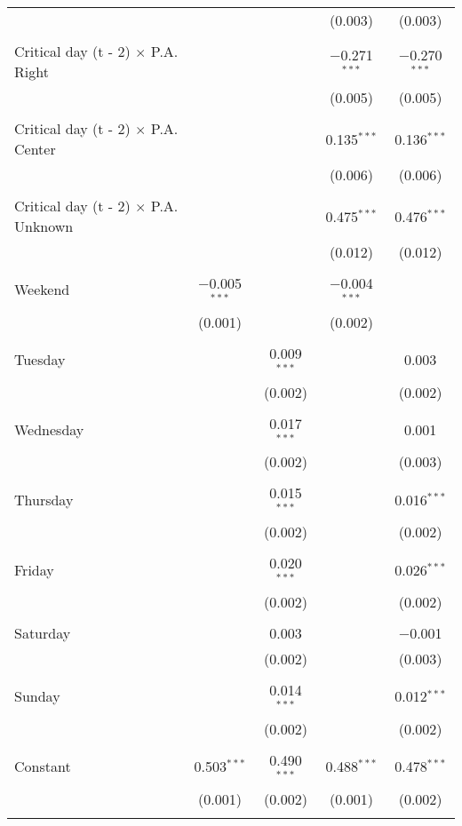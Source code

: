 \documentclass[
]{article}
\begin{document}
\begin{table}[!htbp]
{\begin{tabular}{@{\extracolsep{5pt}}lcccc}
  &  &  & (0.003) & (0.003) \\ 
  & & & & \\ 
 Critical day (t - 2) $\times$ P.A. Right &  &  & $-$0.271$^{***}$ & $-$0.270$^{***}$ \\ 
  &  &  & (0.005) & (0.005) \\ 
  & & & & \\ 
 Critical day (t - 2) $\times$ P.A. Center &  &  & 0.135$^{***}$ & 0.136$^{***}$ \\ 
  &  &  & (0.006) & (0.006) \\ 
  & & & & \\ 
 Critical day (t - 2) $\times$ P.A. Unknown &  &  & 0.475$^{***}$ & 0.476$^{***}$ \\ 
  &  &  & (0.012) & (0.012) \\ 
  & & & & \\ 
 Weekend & $-$0.005$^{***}$ &  & $-$0.004$^{***}$ &  \\ 
  & (0.001) &  & (0.002) &  \\ 
  & & & & \\ 
 Tuesday &  & 0.009$^{***}$ &  & 0.003 \\ 
  &  & (0.002) &  & (0.002) \\ 
  & & & & \\ 
 Wednesday &  & 0.017$^{***}$ &  & 0.001 \\ 
  &  & (0.002) &  & (0.003) \\ 
  & & & & \\ 
 Thursday &  & 0.015$^{***}$ &  & 0.016$^{***}$ \\ 
  &  & (0.002) &  & (0.002) \\ 
  & & & & \\ 
 Friday &  & 0.020$^{***}$ &  & 0.026$^{***}$ \\ 
  &  & (0.002) &  & (0.002) \\ 
  & & & & \\ 
 Saturday &  & 0.003 &  & $-$0.001 \\ 
  &  & (0.002) &  & (0.003) \\ 
  & & & & \\ 
 Sunday &  & 0.014$^{***}$ &  & 0.012$^{***}$ \\ 
  &  & (0.002) &  & (0.002) \\ 
  & & & & \\ 
 Constant & 0.503$^{***}$ & 0.490$^{***}$ & 0.488$^{***}$ & 0.478$^{***}$ \\ 
  & (0.001) & (0.002) & (0.001) & (0.002) \\ 
  & & & & \\ 

\end{tabular}}
\end{table}
\end{document}
